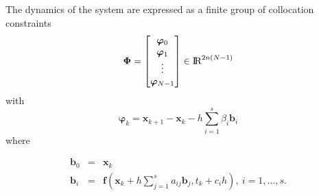 \documentclass[12pt]{article}
\newcommand{\real}{\mbox{\rm I$\!$R}}
\begin{document}
\noindent The dynamics of the system are expressed as a finite group of collocation constraints
%
\begin{equation}
\bm{\Phi}=\begin{bmatrix}
\bm{\varphi}_{0} \\ 
\bm{\varphi}_{1} \\ 
\vdots \\
\bm{\varphi}_{N-1}  
\end{bmatrix}\in \real^{2n(N-1)}
\end{equation} 
%
with
%
\begin{equation}\label{eq:collocationcns}
\bm{\varphi}_{k}=\bm{x}_{k+1}-\bm{x}_{k} - h\sum_{i=1}^{s}\beta_{i} \bm{b}_{i}
\end{equation}
%
where

\begin{eqnarray}
\bm{b}_{0}&=&\bm{x}_{k}\\
\bm{b}_{i}&=&\bm{f}\left(\bm{x}_{k}+h \sum_{j=1}^{s}a_{ij}\bm{b}_{j},t_{k}+c_{i}h \right), \ i=1,\hdots,s.
\end{eqnarray}
\end{document}
